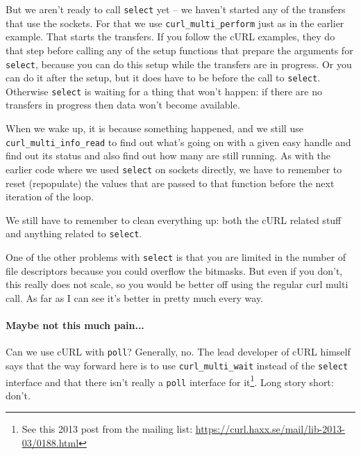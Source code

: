 But we aren't ready to call \texttt{select} yet -- we haven't started any of the transfers  that use the sockets. For that we use \texttt{curl\_multi\_perform} just as in the earlier example. That starts the transfers. If you follow the cURL examples, they do that step before calling any of the setup functions that prepare the arguments for \texttt{select}, because you can do this setup while the transfers are in progress. Or you can do it after the setup, but it does have to be before the call to \texttt{select}. Otherwise \texttt{select} is waiting for a thing that won't happen: if there are no transfers in progress then data won't become available.

When we wake up, it is because something happened, and we still use \texttt{curl\_multi\_info\_read} to find out what's going on with a given easy handle and find out its status and also find out how many are still running. As with the earlier code where we used \texttt{select} on sockets directly, we have to remember to reset (repopulate) the values that are passed to that function before the next iteration of the loop.

We still have to remember to clean everything up: both the cURL related stuff and anything related to \texttt{select}.

One of the other problems with \texttt{select} is that you are limited in the number of file descriptors because you could overflow the bitmasks. But even if you don't, this really does not scale, so you would be better off using the regular curl multi call. As far as I can see it's better in pretty much every way.

\paragraph{Maybe not this much pain...} Can we use cURL with \texttt{poll}? Generally, no. The lead developer of cURL himself says that the way forward here is to use \texttt{curl\_multi\_wait} instead of the \texttt{select} interface and that there isn't really a \texttt{poll} interface for it\footnote{See this 2013 post from the mailing list: \url{https://curl.haxx.se/mail/lib-2013-03/0188.html}}. Long story short: don't.




